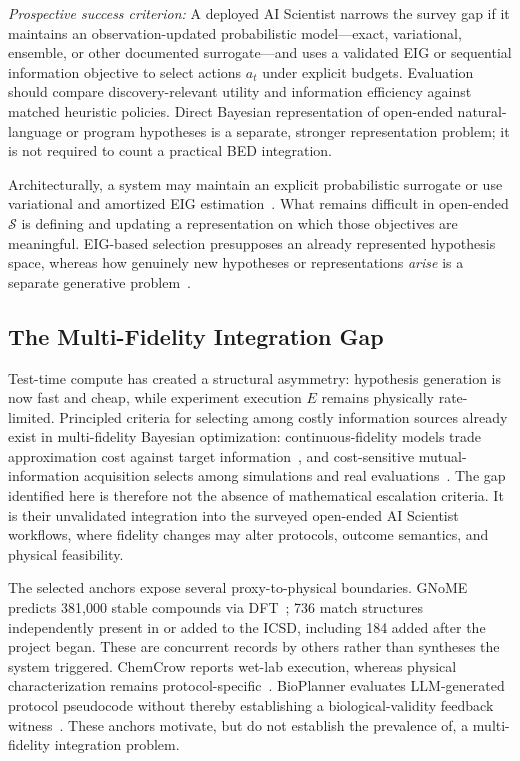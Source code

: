 \documentclass{article}
\begin{document}
\textit{Prospective success criterion:} A deployed AI Scientist narrows the survey gap if it maintains an observation-updated probabilistic model---exact, variational, ensemble, or other documented surrogate---and uses a validated EIG or sequential information objective to select actions $a_t$ under explicit budgets. Evaluation should compare discovery-relevant utility and information efficiency against matched heuristic policies. Direct Bayesian representation of open-ended natural-language or program hypotheses is a separate, stronger representation problem; it is not required to count a practical BED integration.

Architecturally, a system may maintain an explicit probabilistic surrogate or use variational and amortized EIG estimation~\citep{foster2019variational,foster2021dad}. What remains difficult in open-ended $\mathcal S$ is defining and updating a representation on which those objectives are meaningful. EIG-based selection presupposes an already represented hypothesis space, whereas how genuinely new hypotheses or representations \emph{arise} is a separate generative problem~\citep{yanai2019night}.

\subsection{The Multi-Fidelity Integration Gap}
\label{sec:op3}

Test-time compute has created a structural asymmetry: hypothesis generation is now fast and cheap, while experiment execution $E$ remains physically rate-limited. Principled criteria for selecting among costly information sources already exist in multi-fidelity Bayesian optimization: continuous-fidelity models trade approximation cost against target information~\citep{kandasamy2017multifidelity}, and cost-sensitive mutual-information acquisition selects among simulations and real evaluations~\citep{song2019multifidelity}. The gap identified here is therefore not the absence of mathematical escalation criteria. It is their unvalidated integration into the surveyed open-ended AI Scientist workflows, where fidelity changes may alter protocols, outcome semantics, and physical feasibility.

The selected anchors expose several proxy-to-physical boundaries. GNoME predicts 381,000 stable compounds via DFT~\citep{merchant2023gnome}; 736 match structures independently present in or added to the ICSD, including 184 added after the project began. These are concurrent records by others rather than syntheses the system triggered. ChemCrow reports wet-lab execution, whereas physical characterization remains protocol-specific~\citep{bran2023chemcrow,gromski2019chemical}. BioPlanner evaluates LLM-generated protocol pseudocode without thereby establishing a biological-validity feedback witness~\citep{odonoghue2023bioplanner}. These anchors motivate, but do not establish the prevalence of, a multi-fidelity integration problem.
\end{document}
